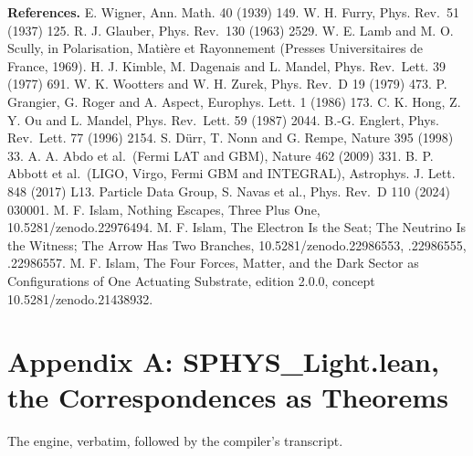 \documentclass[10pt]{article}
\begin{document}
\textbf{References.} E. Wigner, Ann. Math. 40 (1939) 149. W. H. Furry,
Phys. Rev.~51 (1937) 125. R. J. Glauber, Phys. Rev.~130 (1963) 2529. W.
E. Lamb and M. O. Scully, in Polarisation, Matière et Rayonnement
(Presses Universitaires de France, 1969). H. J. Kimble, M. Dagenais and
L. Mandel, Phys. Rev.~Lett. 39 (1977) 691. W. K. Wootters and W. H.
Zurek, Phys. Rev.~D 19 (1979) 473. P. Grangier, G. Roger and A. Aspect,
Europhys. Lett. 1 (1986) 173. C. K. Hong, Z. Y. Ou and L. Mandel, Phys.
Rev.~Lett. 59 (1987) 2044. B.-G. Englert, Phys. Rev.~Lett. 77 (1996)
2154. S. Dürr, T. Nonn and G. Rempe, Nature 395 (1998) 33. A. A. Abdo et
al.~(Fermi LAT and GBM), Nature 462 (2009) 331. B. P. Abbott et
al.~(LIGO, Virgo, Fermi GBM and INTEGRAL), Astrophys. J. Lett. 848
(2017) L13. Particle Data Group, S. Navas et al., Phys. Rev.~D 110
(2024) 030001. M. F. Islam, Nothing Escapes, Three Plus One,
10.5281/\allowbreak{}zenodo.22976494. M. F. Islam, The Electron Is the
Seat; The Neutrino Is the Witness; The Arrow Has Two Branches,
10.5281/\allowbreak{}zenodo.22986553, .22986555, .22986557. M. F. Islam,
The Four Forces, Matter, and the Dark Sector as Configurations of One
Actuating Substrate, edition 2.0.0, concept
10.5281/\allowbreak{}zenodo.21438932.

\hypertarget{appendix-a-sphys_light.lean-the-correspondences-as-theorems}{%
\section{Appendix A: SPHYS\_Light.lean, the Correspondences as
Theorems}\label{appendix-a-sphys_light.lean-the-correspondences-as-theorems}}

The engine, verbatim, followed by the compiler's transcript.
\end{document}
